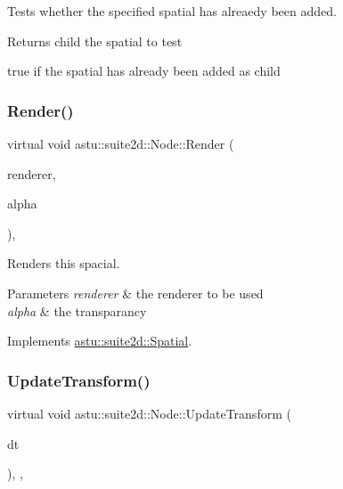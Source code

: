 Tests whether the specified spatial has alreaedy been added.

\begin{DoxyReturn}{Returns}
child the spatial to test 

{\ttfamily true} if the spatial has already been added as child 
\end{DoxyReturn}
\mbox{\label{classastu_1_1suite2d_1_1Node_a01bac6ed4eab4a6c77e1dac7d30d09e6}} 
\subsubsection{\texorpdfstring{Render()}{Render()}}
{\footnotesize\ttfamily virtual void astu\+::suite2d\+::\+Node\+::\+Render (\begin{DoxyParamCaption}\item[{\hyperlink{classastu_1_1suite2d_1_1SceneRenderer2D}{Scene\+Renderer2D} \&}]{renderer,  }\item[{float}]{alpha }\end{DoxyParamCaption})\hspace{0.3cm}{\ttfamily [override]}, {\ttfamily [virtual]}}

Renders this spacial.


\begin{DoxyParams}{Parameters}
{\em renderer} & the renderer to be used \\
\hline
{\em alpha} & the transparancy \\
\hline
\end{DoxyParams}


Implements \hyperlink{classastu_1_1suite2d_1_1Spatial_afaf7797d00a432012298535ba11348b7}{astu\+::suite2d\+::\+Spatial}.

\mbox{\label{classastu_1_1suite2d_1_1Node_af3fbe9c9588b3f20a1d58645fd2371e0}} 
\subsubsection{\texorpdfstring{Update\+Transform()}{UpdateTransform()}}
{\footnotesize\ttfamily virtual void astu\+::suite2d\+::\+Node\+::\+Update\+Transform (\begin{DoxyParamCaption}\item[{double}]{dt }\end{DoxyParamCaption})\hspace{0.3cm}{\ttfamily [override]}, {\ttfamily [protected]}, {\ttfamily [virtual]}}

